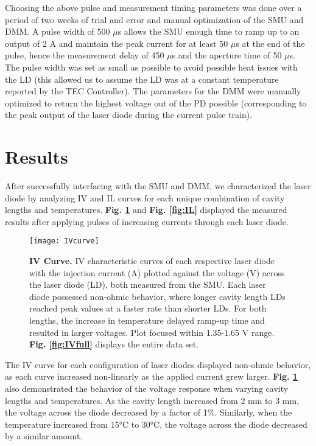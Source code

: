 \documentclass[9pt,twocolumn,twoside]{osajnl}
\begin{document}
Choosing the above pulse and measurement timing parameters was done over a period of two weeks of trial and error and manual optimization of the SMU and DMM. A pulse width of 500 $\mu$s allows the SMU enough time to ramp up to an output of 2 A and maintain the peak current for at least 50 $\mu$s at the end of the pulse, hence the measurement delay of 450 $\mu$s and the aperture time of 50 $\mu$s. The pulse width was set as small as possible to avoid possible heat issues with the LD (this allowed us to assume the LD was at a constant temperature reported by the TEC Controller). The parameters for the DMM were manually optimized to return the highest voltage out of the PD possible (corresponding to the peak output of the laser diode during the current pulse train).


\section{Results}
\indent \indent After successfully interfacing with the SMU and DMM, we characterized the laser diode by analyzing IV and IL curves for each unique combination of cavity lengths and temperatures. \textbf{Fig. \ref{fig:IV}} and \textbf{Fig. \ref{fig:IL}} displayed the measured results after applying pulses of increasing currents through each laser diode. 

\begin{figure}[htbp]
\centering
\texttt{[image: IVcurve]}
\caption{\textbf{IV Curve.} IV characteristic curves of each respective laser diode with the injection current (A) plotted against the voltage (V) across the laser diode (LD), both measured from the SMU. Each laser diode possessed non-ohmic behavior, where longer cavity length LDs reached peak values at a faster rate than shorter LDs. For both lengths, the increase in temperature delayed ramp-up time and resulted in larger voltages. Plot focused within 1.35-1.65 V range. \textbf{Fig. \ref{fig:IVfull}} displays the entire data set.}
\label{fig:IV}
\end{figure}

The IV curve for each configuration of laser diodes displayed non-ohmic behavior, as each curve increased non-linearly as the applied current grew larger. \textbf{Fig. \ref{fig:IV}} also demonstrated the behavior of the voltage response when varying cavity lengths and temperatures. As the cavity length increased from 2 mm to 3 mm, the voltage across the diode decreased by a factor of 1\%. Similarly, when the temperature increased from 15°C to 30°C, the voltage across the diode decreased by a similar amount. 
\end{document}
